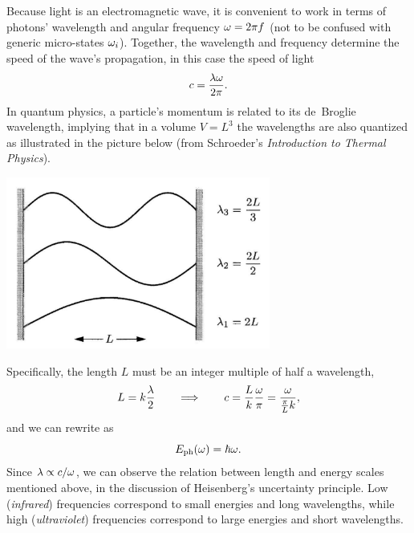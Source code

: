 Because light is an electromagnetic wave, it is convenient to work in terms of photons' wavelength \la and angular frequency $\omega = 2\pi f$ (not to be confused with generic micro-states $\omega_i$).
Together, the wavelength and frequency determine the speed of the wave's propagation, in this case the speed of light %
\begin{equation*}
  c = \frac{\lambda \omega}{2\pi}.
\end{equation*}
In quantum physics, a particle's momentum is related to its de~Broglie wavelength, implying that in a volume $V = L^3$ the wavelengths are also quantized as illustrated in the picture below (from Schroeder's \textit{Introduction to Thermal Physics}). \\[-24 pt]
\begin{center}\includegraphics[width=0.65\textwidth]{figs/unit08_wavelengths.pdf}\end{center}

Specifically, the length $L$ must be an integer multiple of half a wavelength,
\begin{equation*}
  L = k \frac{\lambda}{2} \qquad \Longrightarrow \qquad c = \frac{L}{k} \frac{\omega}{\pi} = \frac{\omega}{\frac{\pi}{L} k},
\end{equation*}
and we can rewrite  as
\begin{equation}
  \label{eq:photon_omega}
  E_{\text{ph}}(\omega) = \hbar \omega.
\end{equation}
Since $\lambda \propto c / \omega$, we can observe the relation between length and energy scales mentioned above, in the discussion of Heisenberg's uncertainty principle.
Low (\textit{infrared}) frequencies correspond to small energies and long wavelengths, while high (\textit{ultraviolet}) frequencies correspond to large energies and short wavelengths.

